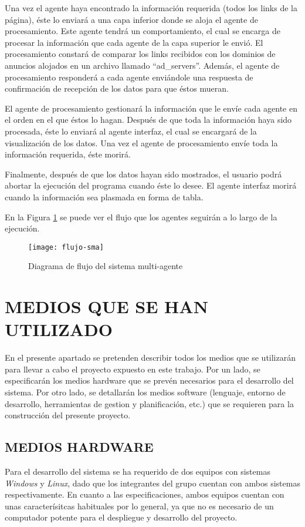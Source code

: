 \documentclass{pre-tfg}
\begin{document}
Una vez el agente haya encontrado la información requerida (todos los links de la página), éste lo enviará a una capa inferior donde se aloja el agente de procesamiento. Este agente tendrá un comportamiento, el cual se encarga de procesar la información que cada agente de la capa superior le envió. El procesamiento constará de comparar los links recibidos con los dominios de anuncios alojados en un archivo llamado ``ad\_servers''. Además, el agente de procesamiento responderá a cada agente enviándole una respuesta de confirmación de recepción de los datos para que éstos mueran.

El agente de procesamiento gestionará la información que le envíe cada agente en el orden en el que éstos lo hagan. Después de que toda la información haya sido procesada, éste lo enviará al agente interfaz, el cual se encargará de la visualización de los datos. Una 
vez el agente de procesamiento envíe toda la información requerida, éste morirá.

Finalmente, después de que los datos hayan sido mostrados, el usuario podrá abortar la ejecución del programa cuando éste lo desee. El agente interfaz morirá cuando la información sea plasmada en forma de tabla.

En la Figura \ref{fig:flujo-sma} se puede ver el flujo que los agentes seguirán a lo largo de la ejecución.

\begin{figure}[h]
    \centering
    \texttt{[image: flujo-sma]}
    \caption{Diagrama de flujo del sistema multi-agente}
    \label{fig:flujo-sma}
\end{figure}

\clearpage

\section{MEDIOS QUE SE HAN UTILIZADO}
En el presente apartado se pretenden describir todos los medios que se utilizarán para llevar a cabo el proyecto
expuesto en este trabajo. Por un lado, se especificarán los medios hardware que se prevén necesarios para el desarrollo
del sistema. Por otro lado, se detallarán los medios software (lenguaje, entorno de desarrollo, herramientas de gestion y 
planificación, etc.) que se requieren para la construcción del presente proyecto.

\subsection{MEDIOS HARDWARE}
Para el desarrollo del sistema se ha requerido de dos equipos con sistemas \textit{Windows} y \textit{Linux}, dado
que los integrantes del grupo cuentan con ambos sistemas respectivamente. En cuanto a las especificaciones, ambos equipos
cuentan con unas caracterísitcas habituales por lo general, ya que no es necesario de un computador potente para el despliegue y desarrollo del
proyecto.
\end{document}

